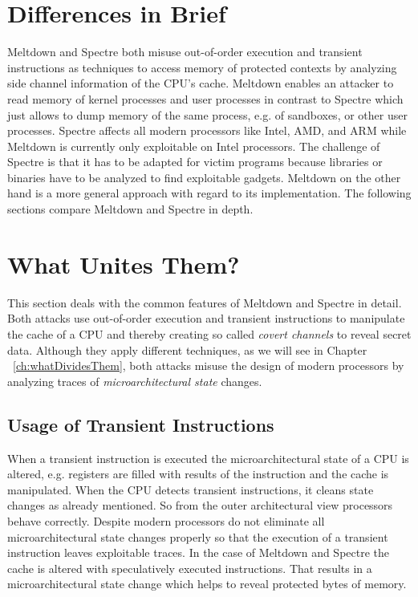 \documentclass[a4paper,oneside,openright] {scrreprt}
\begin{document}
 
 \section{Differences in Brief}
 \label{ch:intro:motivation}
 
Meltdown and Spectre both misuse out-of-order execution and transient instructions as techniques to access memory of 
protected contexts by analyzing side channel information of the CPU's cache. 
Meltdown enables an attacker to read memory of kernel processes and user processes
in contrast to Spectre which just allows to dump memory of the same process, e.g. of sandboxes, or other user processes. 
Spectre affects all modern processors like Intel, AMD, and ARM while Meltdown
is currently only exploitable on Intel processors. 
The challenge of Spectre is that it has to be adapted for victim programs
because libraries or binaries have to be analyzed to find exploitable gadgets. 
Meltdown on the other hand is a more general approach with regard to its implementation. The following sections compare Meltdown and Spectre in depth.
 
\section{What Unites Them?}
\label{ch:intro:motivation}

This section deals with the common features of Meltdown and Spectre in detail. 
Both attacks use out-of-order execution and transient instructions to manipulate the cache of a CPU and thereby
creating so called \textit{covert channels} to reveal secret data. Although they apply different techniques, 
as we will see in Chapter ~\ref{ch:whatDividesThem}, both attacks misuse the design of modern processors
by analyzing traces of \textit{microarchitectural state} changes. 

\subsection{Usage of Transient Instructions}
\label{ch:intro:motivation:A}

When a transient instruction is executed the microarchitectural state of a CPU is altered, e.g. registers are filled with results
of the instruction and the cache is manipulated. When the CPU detects transient instructions,
 it cleans state changes as already mentioned. 
 So from the outer architectural view processors behave correctly. 
Despite modern processors do not eliminate all microarchitectural state changes properly so that the execution of a transient instruction
 leaves exploitable traces. In the case of Meltdown and Spectre the cache is altered with speculatively executed instructions. 
That results in a microarchitectural state change which helps to reveal protected bytes of memory.
\end{document}
